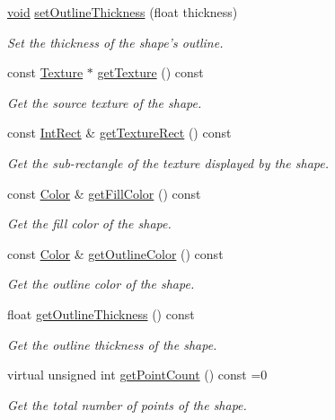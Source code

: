 \begin{DoxyCompactItemize}
\hyperlink{glutf90_8h_ac778d6f63f1aaf8ebda0ce6ac821b56e}{void} \hyperlink{classsf_1_1_shape_a5ad336ad74fc1f567fce3b7e44cf87dc}{set\-Outline\-Thickness} (float thickness)
\begin{DoxyCompactList}\small\item\em Set the thickness of the shape's outline. \end{DoxyCompactList}\item 
const \hyperlink{classsf_1_1_texture}{Texture} $\ast$ \hyperlink{classsf_1_1_shape_a1bf27ac425fcce36efd0eed67531a403}{get\-Texture} () const 
\begin{DoxyCompactList}\small\item\em Get the source texture of the shape. \end{DoxyCompactList}\item 
const \hyperlink{namespacesf_aae67411782674934f78d55fa3af18403}{Int\-Rect} \& \hyperlink{classsf_1_1_shape_af7c4c80a435b85a622812711cf510439}{get\-Texture\-Rect} () const 
\begin{DoxyCompactList}\small\item\em Get the sub-\/rectangle of the texture displayed by the shape. \end{DoxyCompactList}\item 
const \hyperlink{classsf_1_1_color}{Color} \& \hyperlink{classsf_1_1_shape_ad7f7fe601a8bb24efe9aa77809a35c12}{get\-Fill\-Color} () const 
\begin{DoxyCompactList}\small\item\em Get the fill color of the shape. \end{DoxyCompactList}\item 
const \hyperlink{classsf_1_1_color}{Color} \& \hyperlink{classsf_1_1_shape_a4fa7d3bf5ee2332f6b9d9bebe9b1e2fd}{get\-Outline\-Color} () const 
\begin{DoxyCompactList}\small\item\em Get the outline color of the shape. \end{DoxyCompactList}\item 
float \hyperlink{classsf_1_1_shape_ac66f917b41eda6159a8ba6571d77f2ad}{get\-Outline\-Thickness} () const 
\begin{DoxyCompactList}\small\item\em Get the outline thickness of the shape. \end{DoxyCompactList}\item 
virtual unsigned int \hyperlink{classsf_1_1_shape_ad84e1b675ecd270ad8151aea4e271a78}{get\-Point\-Count} () const =0
\begin{DoxyCompactList}\small\item\em Get the total number of points of the shape. \end{DoxyCompactList}\item 

\end{DoxyCompactItemize}

